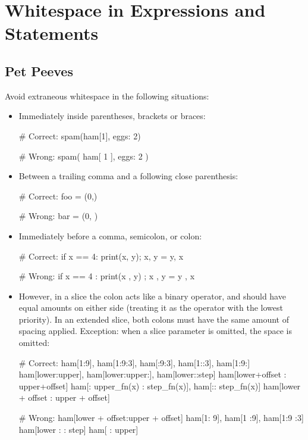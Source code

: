 \documentclass[a4paper,11pt]{article}
\begin{document}
\section{Whitespace in Expressions and Statements}
\subsection{Pet Peeves}
Avoid extraneous whitespace in the following situations:
\par
\begin{itemize}
\item Immediately inside parentheses, brackets or braces:
\begin{python}
# Correct:
spam(ham[1], {eggs: 2})
\end{python}
\begin{python}
# Wrong:
spam( ham[ 1 ], { eggs: 2 } )
\end{python}
\item Between a trailing comma and a following close parenthesis:
\begin{python}
# Correct:
foo = (0,)
\end{python}
\begin{python}
# Wrong:
bar = (0, )
\end{python}
\item Immediately before a comma, semicolon, or colon:
\begin{python}
# Correct:
if x == 4: print(x, y); x, y = y, x
\end{python}
\begin{python}
# Wrong:
if x == 4 : print(x , y) ; x , y = y , x
\end{python}
\item However, in a slice the colon acts like a binary operator, and should
have equal amounts on either side (treating it as the operator with the lowest
priority). In an extended slice, both colons must have the same amount of
spacing applied. Exception: when a slice parameter is omitted, the space is
omitted:
\begin{python}
# Correct:
ham[1:9], ham[1:9:3], ham[:9:3], ham[1::3], ham[1:9:]
ham[lower:upper], ham[lower:upper:], ham[lower::step]
ham[lower+offset : upper+offset]
ham[: upper_fn(x) : step_fn(x)], ham[:: step_fn(x)]
ham[lower + offset : upper + offset]
\end{python}
\begin{python}
# Wrong:
ham[lower + offset:upper + offset]
ham[1: 9], ham[1 :9], ham[1:9 :3]
ham[lower : : step]
ham[ : upper]
\end{python}

\end{itemize}
\end{document}
